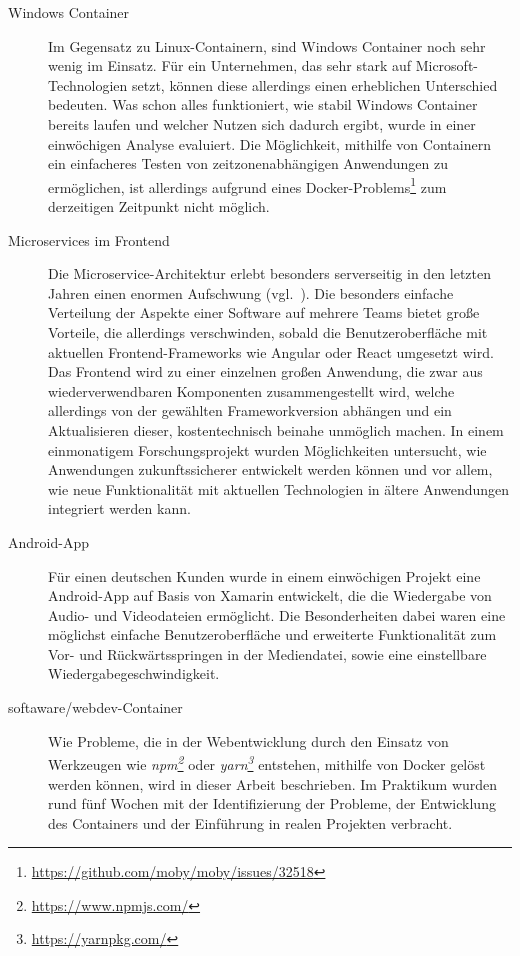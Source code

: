 \begin{description}
    \item [Windows Container]
    Im Gegensatz zu Linux-Containern, sind Windows Container noch sehr wenig im Einsatz.
    Für ein Unternehmen, das sehr stark auf Microsoft-Technologien setzt, können diese allerdings einen erheblichen Unterschied bedeuten.
    Was schon alles funktioniert, wie stabil Windows Container bereits laufen und welcher Nutzen sich dadurch ergibt, wurde in einer einwöchigen Analyse evaluiert.
    Die Möglichkeit, mithilfe von Containern ein einfacheres Testen von zeitzonenabhängigen Anwendungen zu ermöglichen, ist allerdings aufgrund eines Docker-Problems\footnote{\url{https://github.com/moby/moby/issues/32518}} zum derzeitigen Zeitpunkt nicht möglich.
    \item [Microservices im Frontend]
    Die Microservice-Architektur erlebt besonders serverseitig in den letzten Jahren einen enormen Aufschwung (vgl.~\autocite{Fowler.Microservices:online}).
    Die besonders einfache Verteilung der Aspekte einer Software auf mehrere Teams bietet große Vorteile, die allerdings verschwinden, sobald die Benutzeroberfläche mit aktuellen Frontend-Frameworks wie Angular oder React umgesetzt wird.
    Das Frontend wird zu einer einzelnen großen Anwendung, die zwar aus wiederverwendbaren Komponenten zusammengestellt wird, welche allerdings von der gewählten Frameworkversion abhängen und ein Aktualisieren dieser, kostentechnisch beinahe unmöglich machen.
    In einem einmonatigem Forschungsprojekt wurden Möglichkeiten untersucht, wie Anwendungen zukunftssicherer entwickelt werden können und vor allem, wie neue Funktionalität mit aktuellen Technologien in ältere Anwendungen integriert werden kann.
    \item [Android-App]
    Für einen deutschen Kunden wurde in einem einwöchigen Projekt eine Android-App auf Basis von Xamarin entwickelt, die die Wiedergabe von Audio- und Videodateien ermöglicht.
    Die Besonderheiten dabei waren eine möglichst einfache Benutzeroberfläche und erweiterte Funktionalität zum Vor- und Rückwärtsspringen in der Mediendatei, sowie eine einstellbare Wiedergabegeschwindigkeit.
    \item [softaware/webdev-Container]
    Wie Probleme, die in der Webentwicklung durch den Einsatz von Werkzeugen wie \emph{npm\footnote{\url{https://www.npmjs.com/}}} oder \emph{yarn\footnote{\url{https://yarnpkg.com/}}} entstehen, mithilfe von Docker gelöst werden können, wird in dieser Arbeit beschrieben.
    Im Praktikum wurden rund fünf Wochen mit der Identifizierung der Probleme, der Entwicklung des Containers und der Einführung in realen Projekten verbracht.
\end{description}
